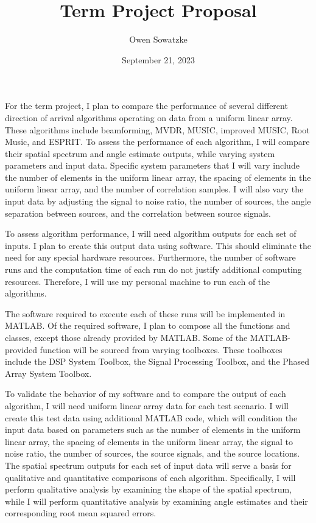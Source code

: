 \documentclass{article}
\title{Term Project Proposal}
\author{Owen Sowatzke}
\date{September 21, 2023}
\begin{document}
	\maketitle

	For the term project, I plan to compare the performance of several different direction of arrival algorithms operating on data from a uniform linear array. These algorithms include beamforming, MVDR, MUSIC, improved MUSIC, Root Music, and ESPRIT. To assess the performance of each algorithm, I will compare their spatial spectrum and angle estimate outputs, while varying system parameters and input data. Specific system parameters that I will vary include the number of elements in the uniform linear array, the spacing of elements in the uniform linear array, and the number of correlation samples. I will also vary the input data by adjusting the signal to noise ratio, the number of sources, the angle separation between sources, and the correlation between source signals.
	
	To assess algorithm performance, I will need algorithm outputs for each set of inputs. I plan to create this output data using software. This should eliminate the need for any special hardware resources. Furthermore, the number of software runs and the computation time of each run do not justify additional computing resources. Therefore, I will use my personal machine to run each of the algorithms.
	
	The software required to execute each of these runs will be implemented in MATLAB. Of the required software, I plan to compose all the functions and classes, except those already provided by MATLAB. Some of the MATLAB-provided function will be sourced from varying toolboxes. These toolboxes include the DSP System Toolbox, the Signal Processing Toolbox, and the Phased Array System Toolbox.
	
	To validate the behavior of my software and to compare the output of each algorithm, I will need uniform linear array data for each test scenario. I will create this test data using additional MATLAB code, which will condition the input data based on parameters such as the number of elements in the uniform linear array, the spacing of elements in the uniform linear array, the signal to noise ratio, the number of sources, the source signals, and the source locations. The spatial spectrum outputs for each set of input data will serve a basis for qualitative and quantitative comparisons of each algorithm. Specifically, I will perform qualitative analysis by examining the shape of the spatial spectrum, while I will perform quantitative analysis by examining angle estimates and their corresponding root mean squared errors.
	
	\nocite{doa_algorithms_raghu}
	\nocite{mvdr_montlouis}
	\nocite{capon_sanudin}
	\nocite{music_chowdhury}
	\nocite{improved_music_gupta}
	\nocite{root_music_esprit_patwari}
	\nocite{esprit_ning}
	\newpage
	{}
	
\end{document}
